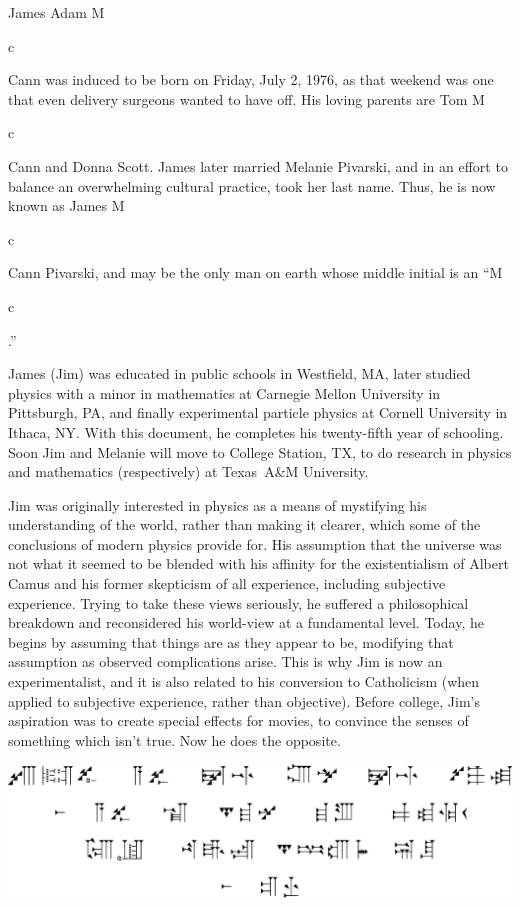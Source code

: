 \documentclass{cornell}
\newlength{\Mheight}
\newlength{\cwidth}
\newcommand{\emc}{\settoheight{\Mheight}{M}\settowidth{\cwidth}{c}M\parbox[b][\Mheight][t]{\cwidth}{c}}
\begin{document}
\begin{biosketch}
  James Adam \emc Cann was induced to be born on Friday, July
  2, 1976, as that weekend was one that even delivery surgeons wanted
  to have off.  His loving parents are Tom \emc Cann and
  Donna Scott.  James later married Melanie Pivarski, and in an effort
  to balance an overwhelming cultural practice, took her last name.
  Thus, he is now known as James \emc Cann Pivarski, and may
  be the only man on earth whose middle initial is an
  ``\emc.''

  James (Jim) was educated in public schools in Westfield, MA, later
  studied physics with a minor in mathematics at Carnegie Mellon
  University in Pittsburgh, PA, and finally experimental particle
  physics at Cornell University in Ithaca, NY.  With this document, he
  completes his twenty-fifth year of schooling.  Soon Jim and Melanie
  will move to College Station, TX, to do research in physics and
  mathematics (respectively) at Texas~A\&M University.
  
  Jim was originally interested in physics as a means of mystifying
  his understanding of the world, rather than making it clearer, which
  some of the conclusions of modern physics provide for.  His
  assumption that the universe was not what it seemed to be blended
  with his affinity for the existentialism of Albert Camus and his
  former skepticism of all experience, including subjective
  experience.  Trying to take these views seriously, he suffered a
  philosophical breakdown and reconsidered his world-view at a
  fundamental level.  Today, he begins by assuming that things are as
  they appear to be, modifying that assumption as observed
  complications arise.  This is why Jim is now an experimentalist, and
  it is also related to his conversion to Catholicism (when applied to
  subjective experience, rather than objective).  Before college,
  Jim's aspiration was to create special effects for movies, to
  convince the senses of something which isn't true.  Now he does the
  opposite.
\end{biosketch}
\begin{dedication}
  \includegraphics[width=\linewidth]{dedication}
\end{dedication}
\end{document}
